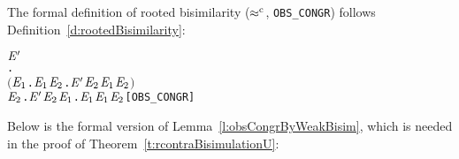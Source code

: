 The formal definition of rooted bisimilarity ($\mathrel{\approx^{\rm{c}}}$, \texttt{OBS_CONGR}) 
follows Definition~\ref{d:rootedBisimilarity}:
\begin{alltt}
    \HOLSymConst{\HOLTokenObsCongr} \ensuremath{\HOLFreeVar{E}\sp{\prime}} \HOLTokenDefEquality{}
     \HOLSymConst{\HOLTokenForall{}}.
         \ensuremath{(}\HOLSymConst{\HOLTokenForall{}}\ensuremath{\HOLBoundVar{E}\sb{\mathrm{1}}}.  \HOLTokenTransBegin{}\HOLTokenTransEnd \ensuremath{\HOLBoundVar{E}\sb{\mathrm{1}}} \HOLSymConst{\HOLTokenImp{}} \HOLSymConst{\HOLTokenExists{}}\ensuremath{\HOLBoundVar{E}\sb{\mathrm{2}}}. \ensuremath{\HOLFreeVar{E}\sp{\prime}} \HOLTokenWeakTransBegin{}\HOLTokenWeakTransEnd \ensuremath{\HOLBoundVar{E}\sb{\mathrm{2}}} \HOLSymConst{\HOLTokenConj{}} \ensuremath{\HOLBoundVar{E}\sb{\mathrm{1}}} \HOLSymConst{\HOLTokenWeakEQ} \ensuremath{\HOLBoundVar{E}\sb{\mathrm{2}}}\ensuremath{)} \HOLSymConst{\HOLTokenConj{}}
         \HOLSymConst{\HOLTokenForall{}}\ensuremath{\HOLBoundVar{E}\sb{\mathrm{2}}}. \ensuremath{\HOLFreeVar{E}\sp{\prime}} \HOLTokenTransBegin{}\HOLTokenTransEnd \ensuremath{\HOLBoundVar{E}\sb{\mathrm{2}}} \HOLSymConst{\HOLTokenImp{}} \HOLSymConst{\HOLTokenExists{}}\ensuremath{\HOLBoundVar{E}\sb{\mathrm{1}}}.  \HOLTokenWeakTransBegin{}\HOLTokenWeakTransEnd \ensuremath{\HOLBoundVar{E}\sb{\mathrm{1}}} \HOLSymConst{\HOLTokenConj{}} \ensuremath{\HOLBoundVar{E}\sb{\mathrm{1}}} \HOLSymConst{\HOLTokenWeakEQ} \ensuremath{\HOLBoundVar{E}\sb{\mathrm{2}}}\hfill{[OBS_CONGR]}
\end{alltt}
Below is the formal version of Lemma~\ref{l:obsCongrByWeakBisim}, which is needed in the proof
of Theorem~\ref{t:rcontraBisimulationU}:
